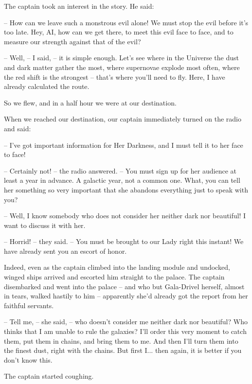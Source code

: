 \documentclass[ebook,twoside,final,openright]{memoir}
\begin{document}
\par
The captain took an interest in the story. He said:\par
– How can we leave such a monstrous evil alone! We must stop the evil before it’s too late. Hey, AI, how can we get there, to meet this evil face to face, and to measure our strength against that of the evil?\par
– Well, – I said, – it is simple enough. Let's see where in the Universe the dust and dark matter gather the most, where supernovae explode most often, where the red shift is the strongest – that’s where you’ll need to fly. Here, I have already calculated the route.\par
So we flew, and in a half hour we were at our destination.\par
\par
When we reached our destination, our captain immediately turned on the radio and said:\par
– I've got important information for Her Darkness, and I must tell it to her face to face!\par
– Certainly not! – the radio answered. – You must sign up for her audience at least a year in advance. A galactic year, not a common one. What, you can tell her something so very important that she abandons everything just to speak with you?\par
– Well, I know somebody who does not consider her neither dark nor beautiful! I want to discuss it with her.\par
– Horrid! – they said. – You must be brought to our Lady right this instant! We have already sent you an escort of honor.\par
\par
Indeed, even as the captain climbed into the landing module and undocked, winged ships arrived and escorted him straight to the palace. The captain disembarked and went into the palace – and who but Gala-Drivel herself, almost in tears, walked hastily to him – apparently she’d already got the report from her faithful servants.\par
– Tell me, – she said, – who doesn’t consider me neither dark nor beautiful? Who thinks that I am unable to rule the galaxies? I’ll order this very moment to catch them, put them in chains, and bring them to me. And then I’ll turn them into the finest dust, right with the chains. But first I... then again, it is better if you don’t know this.\par
The captain started coughing.\par
\end{document}
